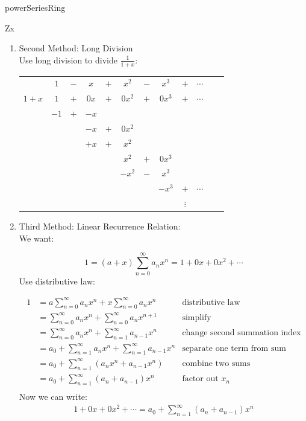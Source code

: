 \begin{example}{powerSeriesRing}
\begin{example}{Zx}
\begin{enumerate}
\item Second Method: Long Division\\

Use long division to divide $\frac{1}{1+x}:$\\ 

\begin{tabular}{cccccccccccc}
&  $1$ & $-$ & $x$ & $+$ & $x^2$ & $-$ & $x^3$ & $+$ & $\cdots$\\ \cline{2-10}

\multicolumn{1}{r|}{$1 + x$}
&  $1$ & $+$ & $0x$ & $+$ & $0x^2$ & $+$ & $0x^3$ & $+$ & $\cdots$\\
& $-1$ & $+$ & $-x$\\ \cline{2-4}
&      &     & $-x$ & $+$ & $0x^2$\\ 
&      &     & $+x$ & $+$ & $x^2$\\ \cline{4-8}
&      &     &      &     & $x^2$ & $+$ & $0x^3$\\ 
&      &     &      &     & $-x^2$ & $-$ & $x^3$\\ \cline{6-8}
&      &     &      &     &       &        & $-x^3$ & $+$ &  $\cdots$\\
&      &     &      &     &       &        &        & $\vdots$\\

\end{tabular}

\item Third Method: Linear Recurrence Relation:\\

We want:

\begin{equation*}{}
1=(a+x)\sum_{n=0}^{\infty}a_nx^n=1+0x+0x^2+\cdots
\end{equation*}
Use distributive law:

\begin{align*}
1&=a\sum_{n=0}^{\infty}a_nx^n+x\sum_{n=0}^{\infty}a_nx^{n}  & \text{distributive law}\\
&=\sum_{n=0}^{\infty}a_nx^n+\sum_{n=0}^{\infty}a_nx^{n+1} & \text{simplify}\\
&=\sum_{n=0}^{\infty}a_nx^n+\sum_{n=1}^{\infty}a_{n-1}x^{n} & \text{change second summation index}\\ 
&=a_0+\sum_{n=1}^{\infty}a_nx^n+\sum_{n=1}^{\infty}a_{n-1}x^{n} & \text{separate one term from sum}\\
&=a_0+\sum_{n=1}^{\infty}(a_nx^n+a_{n-1}x^n) & \text{combine two sums}\\
&=a_0+\sum_{n=1}^{\infty}(a_n+a_{n-1})x^n & \text{factor out $x_n$}\\
\end{align*}
Now we can write:
\begin{align*}
1+0x+0x^2+\cdots=a_0+\sum_{n=1}^{\infty}(a_n+a_{n-1})x^n\\
\end{align*}


\end{enumerate}
\end{example}
\end{example}
